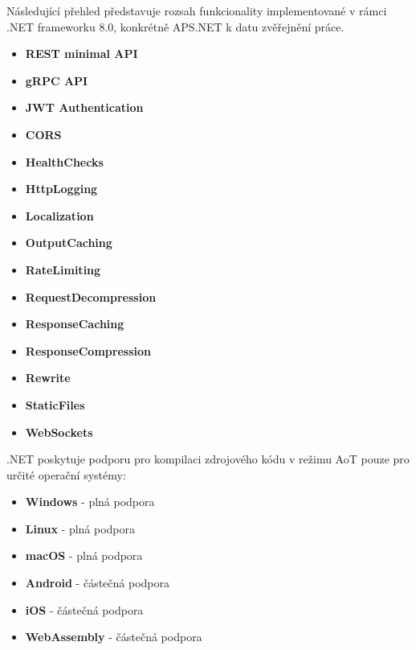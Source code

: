 


Následující přehled představuje rozsah funkcionality implementované v rámci .NET frameworku 8.0, konkrétně APS.NET k datu zvěřejnění práce.

\begin{itemize}
    \item \textbf{REST minimal API}
    \item \textbf{gRPC API}
    \item \textbf{JWT Authentication}
    \item \textbf{CORS}
    \item \textbf{HealthChecks}
    \item \textbf{HttpLogging}
    \item \textbf{Localization}
    \item \textbf{OutputCaching}
    \item \textbf{RateLimiting}
    \item \textbf{RequestDecompression}
    \item \textbf{ResponseCaching}
    \item \textbf{ResponseCompression}
    \item \textbf{Rewrite}
    \item \textbf{StaticFiles}
    \item \textbf{WebSockets}
\end{itemize}


.NET poskytuje podporu pro kompilaci zdrojového kódu v režimu AoT pouze pro určité operační systémy:

\begin{itemize}
    \item \textbf{Windows} - plná podpora
    \item \textbf{Linux} - plná podpora
    \item \textbf{macOS} - plná podpora
    \item \textbf{Android} - částečná podpora
    \item \textbf{iOS} - částečná podpora
    \item \textbf{WebAssembly} - částečná podpora
\end{itemize}




